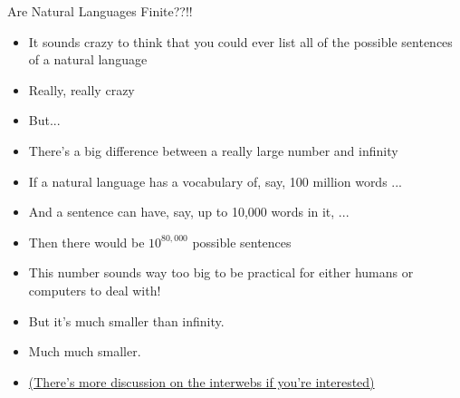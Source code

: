 \documentclass{beamer}
\begin{document}
\begin{frame}{Are Natural Languages Finite??!!}
\begin{block}{}
\begin{itemize}
	\item It sounds crazy to think that you could ever list all of the possible sentences of a natural language
	\pause
	\item Really, really crazy
	\pause
	\item But...
	\pause
	\item There's a big difference between a really large number and infinity
	\pause
	\item {\small If a natural language has a vocabulary of, say, 100 million words ...}
	\pause
	\item And a sentence can have, say, up to 10,000 words in it, ...
	\pause
	\item Then there would be $10^{80,000}$ possible sentences
	\pause
	\item This number sounds way too big to be practical for either humans or computers to deal with!
	\pause
	\item But it's much smaller than infinity.
	\pause
	\item Much much smaller.
	\pause
	\item \tiny{\href{http://people.umass.edu/~partee/726_04/lectures/Is_Language_Infinite.pdf}{(There's more discussion on the interwebs if you're interested)}}
\end{itemize}
\end{block}
\end{frame}
\end{document}
